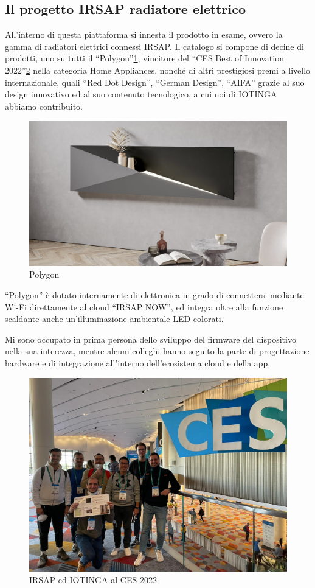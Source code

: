 \documentclass[a4paper,titlepage]{article}
\begin{document}
\subsection{Il progetto IRSAP radiatore elettrico}

All'interno di questa piattaforma si innesta il prodotto in esame,
ovvero la gamma di radiatori elettrici connessi IRSAP. Il catalogo si compone di
decine di prodotti, uno su tutti il ``Polygon''\ref{polygon}, vincitore del 
``CES Best of Innovation 2022''\ref{ces} nella categoria Home Appliances,
nonché di altri prestigiosi premi a livello internazionale, quali ``Red Dot Design'',
``German Design'', ``AIFA'' %
grazie al suo design innovativo ed al suo contenuto tecnologico, 
a cui noi di IOTINGA abbiamo contribuito.

\begin{figure}[ht]
    \centering
    \includegraphics[width=12cm]{img/polygon.jpeg}
    \caption{Polygon}
    \label{polygon}
\end{figure}

``Polygon'' è dotato internamente di elettronica in grado di connettersi mediante
Wi-Fi direttamente al cloud ``IRSAP NOW'', ed integra oltre alla funzione scaldante
anche un'illuminazione ambientale LED colorati.

Mi sono occupato in prima persona dello sviluppo del firmware del dispositivo nella
sua interezza, mentre alcuni colleghi hanno seguito la parte di progettazione hardware 
e di integrazione all'interno dell'ecosistema cloud e della app.

\begin{figure}[ht]
    \centering
    \includegraphics[width=12cm]{img/ces.jpeg}
    \caption{IRSAP ed IOTINGA al CES 2022}
    \label{ces}
\end{figure}
\end{document}
